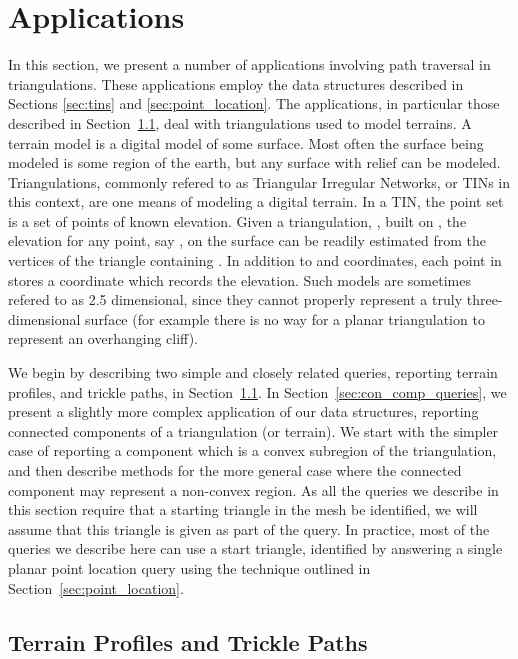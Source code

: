 \section{Applications}
  \label{sec:applications}


  In this section, we present a number of applications involving path traversal
  in triangulations.
  These applications employ the data structures described in Sections \ref{sec:tins}
  and \ref{sec:point_location}.
  The applications, in particular those described in 
  Section~\ref{ssec:ter_profile_tpath}, deal with triangulations used to model 
  terrains.
  A terrain model is a digital model of some surface.
  Most often the surface being modeled is some region of the earth, but any surface
  with relief can be modeled.
  Triangulations, commonly refered to as Triangular Irregular Networks, or TINs 
  in this context, are one means of modeling a digital terrain.
  In a TIN, the point set  is a set of points of known elevation. 
  Given a triangulation, , built on , the elevation for any
  point, say , on the surface can be readily estimated from the vertices
  of the triangle containing .
  In addition to  and  coordinates, each point in  stores a 
  coordinate which records the elevation.
  Such models are sometimes refered to as 2.5 dimensional, since they cannot 
  properly represent a truly three-dimensional surface (for example there is no
  way for a planar triangulation to represent an overhanging cliff). 

  We begin by describing two simple and closely related queries, 
  reporting terrain profiles, and trickle paths, in 
  Section~\ref{ssec:ter_profile_tpath}.  
  In Section~\ref{sec:con_comp_queries}, we present a slightly more complex 
  application of our data structures, 
  reporting connected components of a triangulation (or terrain). 
  We start with the simpler case of reporting a component which is a convex
  subregion of the triangulation, and then describe methods for the more 
  general case where the connected component may represent a non-convex region.
  As all the queries we describe in this section require that a starting 
  triangle in the mesh be identified, we will assume that this triangle
  is given as part of the query.
  In practice, most of the queries we describe here can use a start triangle,
  identified by answering a
  single planar point location query using the technique outlined in 
  Section~\ref{sec:point_location}.

  \subsection{Terrain Profiles and Trickle Paths}\label{ssec:ter_profile_tpath}

